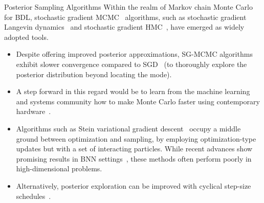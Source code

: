 \documentclass[9pt,handout]{beamer}
\begin{document}
\begin{frame}{Posterior Sampling Algorithms}
Within the realm of Markov chain Monte Carlo~\citep[MCMC;][]{brooks2011handbook} for BDL, \alert{stochastic gradient MCMC}~\citep[SG-MCMC;][]{nemeth2021stochastic} algorithms, such as stochastic gradient Langevin dynamics~\citep[SG-LD;][]{welling2011bayesian} and stochastic gradient HMC~\citep[SG-HMC;][]{chen2014stochastic}, have emerged as widely adopted tools. 
\begin{itemize}[<+->]
	\item Despite offering \alert{improved posterior approximations}, SG-MCMC algorithms exhibit \alert{slower convergence compared to SGD}~\citep{Robbins1951ASA} (to thoroughly explore the posterior distribution beyond locating the mode). 
	\item A step forward in this regard would be to learn from the machine learning and systems community how to make Monte Carlo faster using \alert{contemporary hardware}~\citep{zhang2022low,wang2023enhancing}. %
	\item Algorithms such as \alert{Stein variational gradient descent}~\citep[SVGD;][]{liu2016stein} occupy a \alert{middle ground between optimization and sampling}, by employing optimization-type updates but with a set of interacting particles. While recent advances show promising results in BNN settings~\citep{dangelo2021stein, dangelo2021repulsive, pielok2022approximate}, these methods often perform poorly in high-dimensional problems.
	\item Alternatively, posterior exploration can be improved with cyclical step-size schedules~\citep{zhang2019cyclical}.
\end{itemize}
\end{frame}
\end{document}
